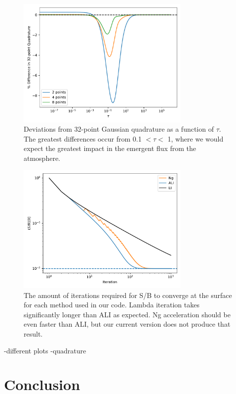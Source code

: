 \documentclass[12pt]{article}
\begin{document}
\begin{figure}[ht]
 \centering
 \includegraphics[width=0.75\textwidth]{quadrature.pdf}
 \caption{Deviations from 32-point Gaussian quadrature as a function of $\tau$. The greatest differences occur from 0.1 $< \tau <$ 1, where we would expect the greatest impact in the emergent flux from the atmosphere.}
\end{figure}

\begin{figure}[ht]
 \centering
 \includegraphics[width=0.75\textwidth]{iterations.pdf}
 \caption{The amount of iterations required for S/B to converge at the surface for each method used in our code. Lambda iteration takes significantly longer than ALI as expected. Ng acceleration should be even faster than ALI, but our current version does not produce that result.}
\end{figure}



-different plots
-quadrature

\section{Conclusion}




\end{document}

